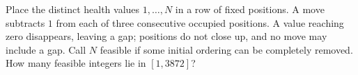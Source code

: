 Place the distinct health values $1,\ldots,N$ in a row of fixed positions. A move subtracts $1$ from each of three consecutive occupied positions. A value reaching zero disappears, leaving a gap; positions do not close up, and no move may include a gap. Call $N$ feasible if some initial ordering can be completely removed. How many feasible integers lie in $[1,3872]$?
